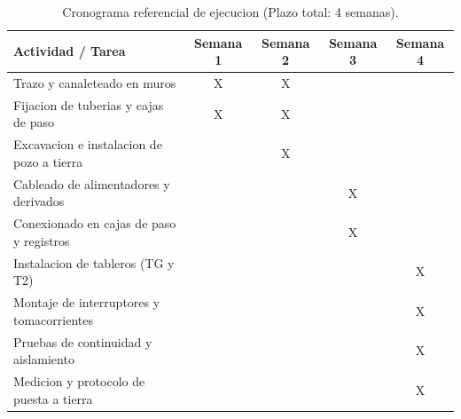 \begin{table}[H]
\centering
\caption{Cronograma referencial de ejecucion (Plazo total: 4 semanas).}
\label{tab:cronograma-referencial}
\begin{tabularx}{\textwidth}{L c c c c}
\toprule
\textbf{Actividad / Tarea} & \textbf{Semana 1} & \textbf{Semana 2} & \textbf{Semana 3} & \textbf{Semana 4} \\
\midrule
Trazo y canaleteado en muros & X & X & & \\
Fijacion de tuberias y cajas de paso & X & X & & \\
Excavacion e instalacion de pozo a tierra & & X & & \\
Cableado de alimentadores y derivados & & & X & \\
Conexionado en cajas de paso y registros & & & X & \\
Instalacion de tableros (TG y T2) & & & & X \\
Montaje de interruptores y tomacorrientes & & & & X \\
Pruebas de continuidad y aislamiento & & & & X \\
Medicion y protocolo de puesta a tierra & & & & X \\
\bottomrule
\end{tabularx}
\end{table}
